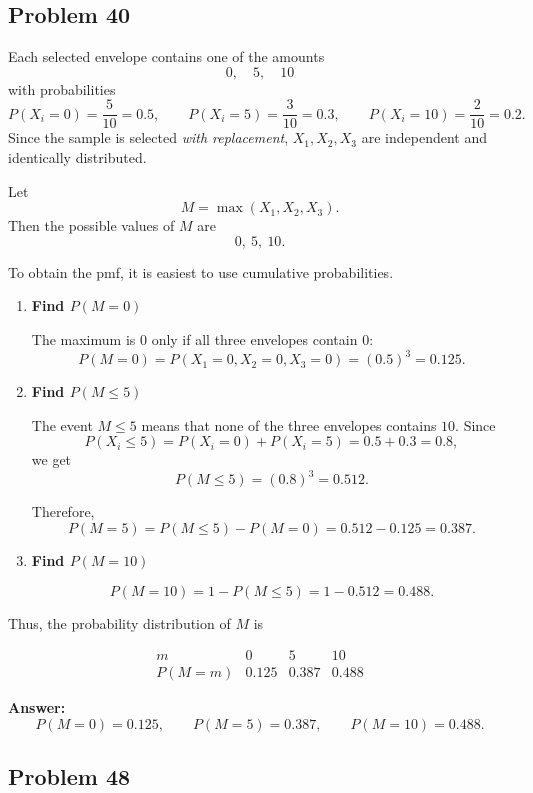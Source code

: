 \documentclass[11pt]{article}
\begin{document}
\subsection*{Problem 40}

Each selected envelope contains one of the amounts
\[
0,\quad 5,\quad 10
\]
with probabilities
\[
P(X_i=0)=\frac{5}{10}=0.5,\qquad
P(X_i=5)=\frac{3}{10}=0.3,\qquad
P(X_i=10)=\frac{2}{10}=0.2.
\]
Since the sample is selected \emph{with replacement}, $X_1,X_2,X_3$ are independent and identically distributed.

Let
\[
M=\max(X_1,X_2,X_3).
\]
Then the possible values of $M$ are
\[
0,\ 5,\ 10.
\]

To obtain the pmf, it is easiest to use cumulative probabilities.

\begin{enumerate}
    \item[\textbf{1.}] \textbf{Find $P(M=0)$}

    The maximum is $0$ only if all three envelopes contain $0$:
    \[
    P(M=0)=P(X_1=0,X_2=0,X_3=0)=(0.5)^3=0.125.
    \]

    \item[\textbf{2.}] \textbf{Find $P(M\le 5)$}

    The event $M\le 5$ means that none of the three envelopes contains $10$.
    Since
    \[
    P(X_i\le 5)=P(X_i=0)+P(X_i=5)=0.5+0.3=0.8,
    \]
    we get
    \[
    P(M\le 5)=(0.8)^3=0.512.
    \]

    Therefore,
    \[
    P(M=5)=P(M\le 5)-P(M=0)=0.512-0.125=0.387.
    \]

    \item[\textbf{3.}] \textbf{Find $P(M=10)$}

    \[
    P(M=10)=1-P(M\le 5)=1-0.512=0.488.
    \]
\end{enumerate}

Thus, the probability distribution of $M$ is

\[
\begin{array}{c|ccc}
m & 0 & 5 & 10\\
\hline
P(M=m) & 0.125 & 0.387 & 0.488
\end{array}
\]

\textbf{Answer:}
\[
P(M=0)=0.125,\qquad P(M=5)=0.387,\qquad P(M=10)=0.488.
\]

\subsection*{Problem 48}
\end{document}
